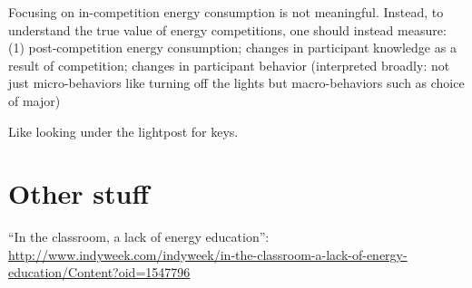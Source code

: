 \documentclass[man]{apa} %
\begin{document}
Focusing on in-competition energy consumption is not meaningful.  Instead, to understand
the true value of energy competitions, one should instead measure: (1) post-competition
energy consumption; changes in participant knowledge as a result of competition; changes
in participant behavior (interpreted broadly: not just micro-behaviors like turning off
the lights but macro-behaviors such as choice of major)

Like looking under the lightpost for keys.

\section{Other stuff}

``In the classroom, a lack of energy education'':
\url{http://www.indyweek.com/indyweek/in-the-classroom-a-lack-of-energy-education/Content?oid=1547796}


\end{document}
